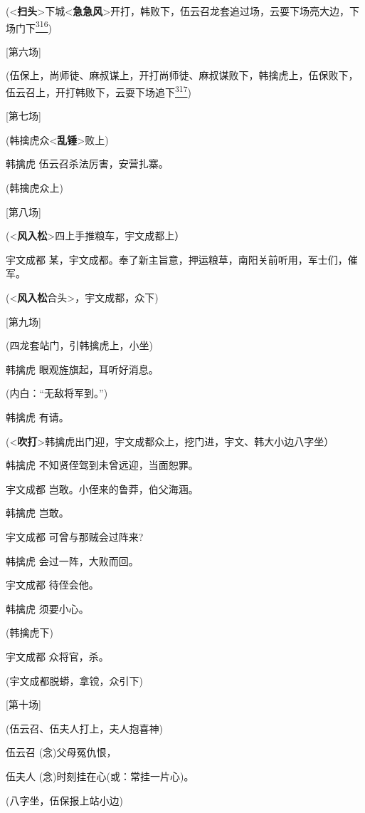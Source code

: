 (\textless{}\textbf{扫头}\textgreater{}下城\textless{}\textbf{急急风}\textgreater{}开打，韩败下，伍云召龙套追过场，云耍下场亮大边，下场门下\protect\hyperlink{fn316}{\textsuperscript{316}})

{[}第六场{]}

(伍保上，尚师徒、麻叔谋上，开打尚师徒、麻叔谋败下，韩擒虎上，伍保败下，伍云召上，开打韩败下，云耍下场追下\protect\hyperlink{fn317}{\textsuperscript{317}})

{[}第七场{]}

(韩擒虎众\textless{}\textbf{乱锤}\textgreater{}败上)

韩擒虎 伍云召杀法厉害，安营扎寨。

(韩擒虎众上)

{[}第八场{]}

(\textless{}\textbf{风入松}\textgreater{}四上手推粮车，宇文成都上）

宇文成都
某，宇文成都。奉了新主旨意，押运粮草，南阳关前听用，军士们，催军。

(\textless{}\textbf{风入松}合头\textgreater{}，宇文成都，众下)

{[}第九场{]}

(四龙套站门，引韩擒虎上，小坐)

韩擒虎 眼观旌旗起，耳听好消息。

(内白：``无敌将军到。'')

韩擒虎 有请。

(\textless{}\textbf{吹打}\textgreater{}韩擒虎出门迎，宇文成都众上，挖门进，宇文、韩大小边八字坐）

韩擒虎 不知贤侄驾到未曾远迎，当面恕罪。

宇文成都 岂敢。小侄来的鲁莽，伯父海涵。

韩擒虎 岂敢。

宇文成都 可曾与那贼会过阵来?

韩擒虎 会过一阵，大败而回。

宇文成都 待侄会他。

韩擒虎 须要小心。

(韩擒虎下)

宇文成都 众将官，杀。

(宇文成都脱蟒，拿镋，众引下)

{[}第十场{]}

(伍云召、伍夫人打上，夫人抱喜神)

伍云召 (念)父母冤仇恨，

伍夫人 (念)时刻挂在心(或：常挂一片心)。

(八字坐，伍保报上站小边)

